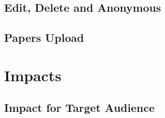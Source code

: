 \documentclass[a4paper]{article}
\begin{document}
    \subsection*{Edit, Delete and Anonymous}

    \subsection*{Papers Upload}

    \section*{Impacts}

    \subsection*{Impact for Target Audience}
\end{document}
